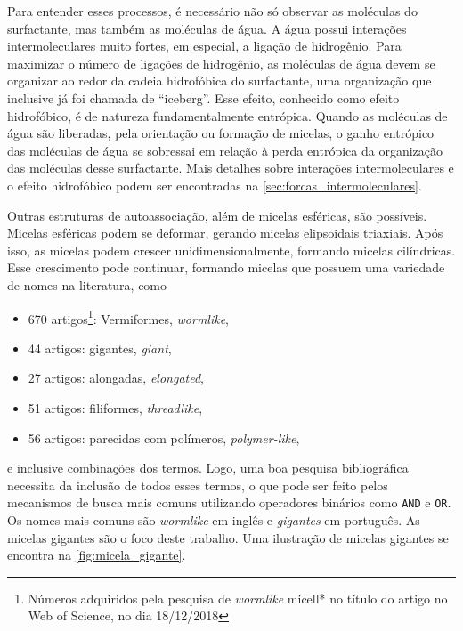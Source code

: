 	Para entender esses processos, é necessário não só observar as moléculas do surfactante, mas também as moléculas de água. A água possui interações intermoleculares muito fortes, em especial, a ligação de hidrogênio. Para maximizar o número de ligações de hidrogênio, as moléculas de água devem se organizar ao redor da cadeia hidrofóbica do surfactante, uma organização que inclusive já foi chamada de ``iceberg''\cite{FrankEvans1945}. Esse efeito, conhecido como efeito hidrofóbico\cite{Tanford1978}, é de natureza fundamentalmente entrópica. Quando as moléculas de água são liberadas, pela orientação ou formação de micelas, o ganho entrópico das moléculas de água se sobressai em relação à perda entrópica da organização das moléculas desse surfactante. Mais detalhes sobre interações intermoleculares e o efeito hidrofóbico podem ser encontradas na \autoref{sec:forcas_intermoleculares}.

	Outras estruturas de autoassociação, além de micelas esféricas, são possíveis.\cite{Lindman_livro} Micelas esféricas podem se deformar, gerando micelas elipsoidais triaxiais.\cite{Alves2017} Após isso, as micelas podem crescer unidimensionalmente, formando micelas cilíndricas. Esse crescimento pode continuar, formando micelas que possuem uma variedade de nomes na literatura, como 
	
	\begin{itemize}[noitemsep]
		\item 670 artigos\footnote{Números adquiridos pela pesquisa de \emph{wormlike} micell* no título do artigo no Web of Science, no dia 18/12/2018}: Vermiformes, \emph{wormlike}\cite{Calabrese2018, Chu2010b, Ito2016, Lin2010a, Dreiss2007},
		\item 44 artigos: gigantes, \emph{giant}\cite{Giant_Micelles, Cates2006, Messager1988a},
		\item 27 artigos: alongadas, \emph{elongated}\cite{Shikata1987, Porte1980a, Oda1999a, Makhloufi1989},
		\item 51 artigos: filiformes, \emph{threadlike}\cite{Danino1995a, Shi2014, Imai2001a,Brown1989a},
		\item 56 artigos: parecidas com polímeros, \emph{polymer-like}\cite{Appel1990, BaldelliBombelli2002a, Garamus2000},
	\end{itemize}
	
	\noindent e inclusive combinações dos termos\cite{Won1999, Georgieva2016}. Logo, uma boa pesquisa bibliográfica necessita da inclusão de todos esses termos, o que pode ser feito pelos mecanismos de busca mais comuns utilizando operadores binários como \texttt{AND} e \texttt{OR}. Os nomes mais comuns são \emph{wormlike} em inglês e \emph{gigantes} em português. As micelas gigantes são o foco deste trabalho. Uma ilustração de micelas gigantes se encontra na \autoref{fig:micela_gigante}. 
		

